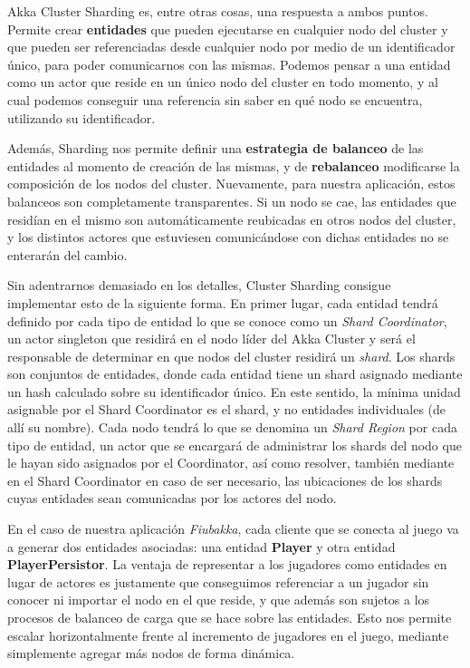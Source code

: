 Akka Cluster Sharding es, entre otras cosas, una respuesta a ambos puntos. Permite crear \textbf{entidades} que pueden ejecutarse en cualquier nodo
del cluster y que pueden ser referenciadas desde cualquier nodo por medio de un identificador único, para poder comunicarnos con las mismas.
Podemos pensar a una entidad como un actor que reside en un único nodo del cluster en todo momento, y al cual podemos conseguir una referencia sin saber
en qué nodo se encuentra, utilizando su identificador.

Además, Sharding nos permite definir una \textbf{estrategia de balanceo} de las entidades al momento de creación de las mismas,
y de \textbf{rebalanceo} modificarse la composición de los nodos del cluster. Nuevamente, para nuestra aplicación, estos balanceos son
completamente transparentes. Si un nodo se cae, las entidades que residían en el mismo son automáticamente reubicadas en otros nodos del cluster,
y los distintos actores que estuviesen comunicándose con dichas entidades no se enterarán del cambio.

Sin adentrarnos demasiado en los detalles, Cluster Sharding consigue implementar esto de la siguiente forma.
En primer lugar, cada entidad tendrá definido por cada tipo de entidad lo que se conoce como un \textit{Shard Coordinator}, un actor singleton
que residirá en el nodo líder del Akka Cluster y será el responsable de determinar en que nodos del cluster residirá
un \textit{shard}. Los shards son conjuntos de entidades, donde cada entidad tiene un shard asignado mediante un hash calculado sobre su
identificador único. En este sentido, la mínima unidad asignable por el Shard Coordinator es el shard, y no entidades individuales (de allí su nombre).
Cada nodo tendrá lo que se denomina un \textit{Shard Region} por cada tipo de entidad, un actor que se encargará de administrar los shards del nodo
que le hayan sido asignados por el Coordinator, así como resolver, también mediante en el Shard Coordinator en caso de ser necesario, las ubicaciones
de los shards cuyas entidades sean comunicadas por los actores del nodo.

En el caso de nuestra aplicación \textit{Fiubakka}, cada cliente que se conecta al juego va a generar dos entidades asociadas: una entidad
\textbf{Player} y otra entidad \textbf{PlayerPersistor}. La ventaja de representar a los jugadores como entidades en lugar de actores es justamente que conseguimos
referenciar a un jugador sin conocer ni importar el nodo en el que reside, y que además son sujetos a los procesos de balanceo de carga que se hace sobre las entidades.
Esto nos permite escalar horizontalmente frente al incremento de jugadores en el juego, mediante simplemente agregar más nodos de forma dinámica.

